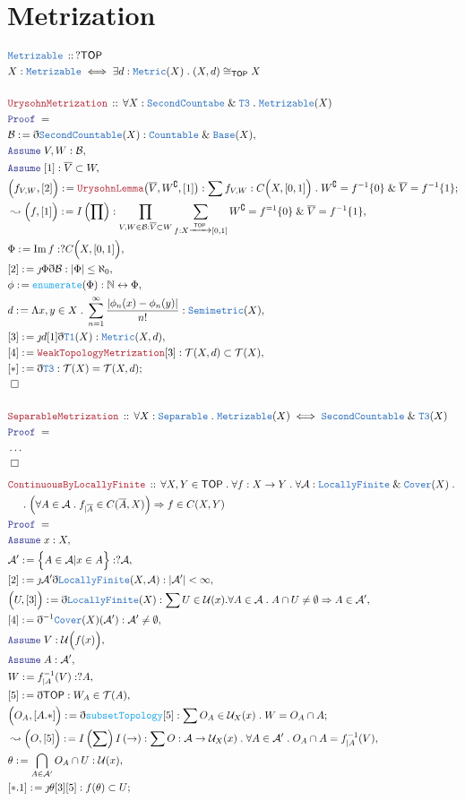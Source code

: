 \documentclass[12pt]{scrartcl}
\newcommand{\TYPE}[1]{\textcolor{NavyBlue}{\mathtt{#1}}}
\newcommand{\FUNC}[1]{\textcolor{Cerulean}{\mathtt{#1}}}
\newcommand{\LOGIC}[1]{\textcolor{Blue}{\mathtt{#1}}}
\newcommand{\THM}[1]{\textcolor{Maroon}{\mathtt{#1}}}
\renewcommand{\.}{\; . \;}
\newcommand{\de}{: \kern 0.1pc =}
\newcommand{\Act}[1]{\left( #1 \right)}
\newcommand{\Theorem}[2]{& \THM{#1} \, :: \, #2 \\ & \Proof = \\ }
\newcommand{\DeclareType}[2]{& \TYPE{#1} \, :: \, #2 \\}
\newcommand{\DefineType}[3]{& #1 : \TYPE{#2} \iff #3 \\}
\newcommand{\NewLine}{\\ & \kern 1pc}
\newcommand{\Page}[1]{ \begin{align*} #1 \end{align*}   }
\newcommand{ \bd }{ \ByDef }
\newcommand{\NoProof}{ & \ldots \\ \EndProof}
\renewcommand{\And}{\; \& \;}
\newcommand{\Imply}{\Rightarrow}
\newcommand{\Nat}{\mathbb{N} }
\DeclareMathOperator*{\im}{Im}
\newcommand{\ToBij}{\leftrightarrow}
\newcommand{\Arrow}{\xrightarrow}
\renewcommand{\c}{\complement}
\newcommand{\Say}[3]{& #1 \de #2 : #3, \\}
\newcommand{\Conclude}[3]{& #1 \de #2 : #3; \\}
\newcommand{\Derive}[3]{& \leadsto #1 \de #2 : #3, \\}
\newcommand{\Assume}[2]{& \LOGIC{Assume} \; #1 : #2, \\}
\newcommand{\QED}{\; \square}
\newcommand{\EndProof}{& \QED \\}
\newcommand{\ByDef}{\eth}
\newcommand{\ByConstr}{\jmath}
\newcommand{\Proof}{\LOGIC{Proof} \; }
\newcommand{\A}{\mathcal{A}}
\newcommand{\B}{\mathcal{B}}
\newcommand{\TOP}{\mathsf{TOP}}
\newcommand{\T}{\mathcal{T}}
\newcommand{\U}{\mathcal{U}}
\begin{document}
\section{Metrization}
\Page{
	\DeclareType{Metrizable}{?\TOP}
	\DefineType{X}{Metrizable}{\exists d : \TYPE{Metric}(X) \. (X,d) \cong_{\TOP} X}
	\\
	\Theorem{UrysohnMetrization}{\forall X : \TYPE{SecondCountabe} \And \TYPE{T3} \. \TYPE{Metrizable}(X)}
	\Say{\mathcal{B}}{\bd \TYPE{SecondCountable}(X)}{\TYPE{Countable} \And \TYPE{Base}(X)}
	\Assume{V,W}{\B}
	\Assume{[1]}{\overline{V} \subset W}
	\Conclude{\Big(f_{V,W},[2]\Big)}{\THM{UrysohnLemma}\big(\overline{V},W^\c,[1]\big)}{\sum f_{V,W} : C\Big(X,[0,1]\Big) \. W^\c =f^{-1}\{0\}  \And \overline{V} = f^{-1}\{1\}}
	\Derive{\Big(f,[1]\Big)}{I\Act{\prod}}{\prod_{V,W \in \B : \overline{V} \subset W} \sum_{f : X \Arrow{\TOP} [0,1]} W^\c = f^{=1}\{0\} \And  \overline{V} = f^{-1}\{1\}  }
	\Say{\Phi}{\im f}{?C\Big(X,[0,1]\Big)}
	\Say{[2]}{\ByConstr \Phi \bd \B}{|\Phi| \le \aleph_0}
	\Say{\phi}{\FUNC{enumerate}(\Phi)}{\Nat \ToBij \Phi}
	\Say{d}{\Lambda x,y \in X \. \sum^\infty_{n=1} \frac{|\phi_n(x) - \phi_n(y)|}{n!}}{\TYPE{Semimetric}(X)}
	\Say{[3]}{\ByConstr d [1] \bd \TYPE{T1}(X)}{\TYPE{Metric}(X,d)}
	\Say{[4]}{\THM{WeakTopologyMetrization}[3]}{ \T(X,d) \subset \T(X) }
	\Conclude{[*]}{\bd \TYPE{T3}}{\T(X) = \T(X,d)}
	\EndProof
	\\
	\Theorem{SeparableMetrization}{\forall X : \TYPE{Separable} \.  \TYPE{Metrizable}(X) \iff \TYPE{SecondCountable} \And \TYPE{T3}(X)   }
	\NoProof
}\Page{
	\Theorem{ContinuousByLocallyFinite}{
		\forall X,Y \in \TOP \. 
		\forall f : X \to Y \. 
		\forall \A : \TYPE{LocallyFinite} \And \TYPE{Cover}(X) \. \NewLine \.
		\Big( \forall A \in \A \. f_{|\overline{A}} \in C(\overline{A},X) \Big) \Imply
		f \in C(X,Y)
	}
	\Assume{x}{X}
	\Say{\A'}{\Big\{ A \in \A |  x \in A  \Big\}}{?\A}
	\Say{[2]}{\ByConstr \A' \bd  \TYPE{LocallyFinite}(X,\A)}{|\A'| < \infty}
	\Say{\Big(U,[3]\Big)}{\bd \TYPE{LocallyFinite}(X)}{\sum U \in \U(x) . \forall  A \in \A \. A \cap U \neq \emptyset \Imply A \in \A'  }
	\Say{[4]}{\bd^{-1} \TYPE{Cover}(X)(\A')}{\A' \neq \emptyset}
	\Assume{V}{\U\Big(f(x)\Big)}
	\Assume{A}{\A'}
	\Say{W}{f_{|A}^{-1}(V)}{?A}
	\Say{[5]}{\bd \TOP}{W_A  \in \T(A) }
	\Conclude{\Big(O_A,[A.*] \Big)}{\bd \FUNC{subsetTopology}[5]}{ \sum O_A \in \U_X(x) \. W = O_A \cap A }
	\Derive{\Big(O, [5] \Big)}{I\Act{\sum} I\Act{\to}}{\sum O : \A \to \U_X(x) \. \forall A \in \A' \. O_A \cap A = f^{-1}_{|A}(V)}
	\Say{\theta}{\bigcap_{A \in \A'}  O_A \cap U}{\U(x)}
	\Conclude{[*.1]}{\ByConstr \theta [3][5]}{f(\theta) \subset  U}
}
\end{document}
